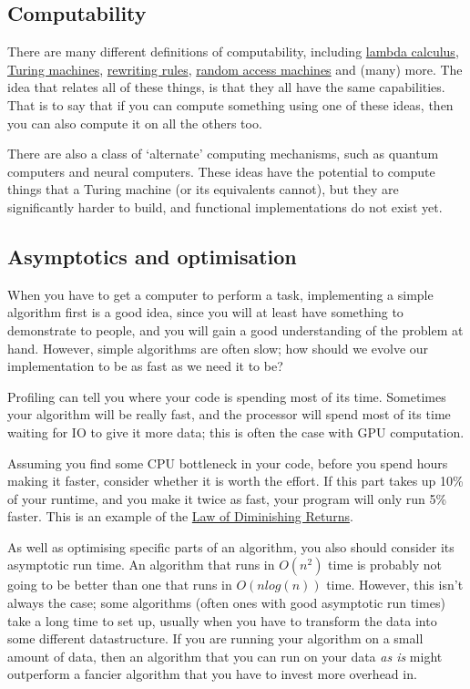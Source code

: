 \subsection{Computability}

There are many different definitions of computability, including
\href{https://en.wikipedia.org/wiki/Lambda_calculus}{lambda calculus},
\href{https://en.wikipedia.org/wiki/Turing_machine}{Turing machines},
\href{https://en.wikipedia.org/wiki/Rewriting}{rewriting rules},
\href{https://en.wikipedia.org/wiki/Random-access_machine}{random access
machines} and (many) more. The idea that relates all of these things, is that
they all have the same capabilities. That is to say that if you can compute
something using one of these ideas, then you can also compute it on all the
others too.

There are also a class of `alternate' computing mechanisms, such as quantum
computers and neural computers. These ideas have the potential to compute things
that a Turing machine (or its equivalents cannot), but they are significantly
harder to build, and functional implementations do not exist yet.

\subsection{Asymptotics and optimisation}

When you have to get a computer to perform a task, implementing a simple
algorithm first is a good idea, since you will at least have something to
demonstrate to people, and you will gain a good understanding of the problem at
hand. However, simple algorithms are often slow; how should we evolve our
implementation to be as fast as we need it to be?

Profiling can tell you where your code is spending most of its time. Sometimes
your algorithm will be really fast, and the processor will spend most of its
time waiting for IO to give it more data; this is often the case with GPU
computation.

Assuming you find some CPU bottleneck in your code, before you spend hours
making it faster, consider whether it is worth the effort. If this part takes up
10\% of your runtime, and you make it twice as fast, your program will only run
5\% faster. This is an example of the
\href{https://en.wikipedia.org/wiki/Diminishing_returns}{Law of Diminishing
Returns}.

As well as optimising specific parts of an algorithm, you also should consider
its asymptotic run time. An algorithm that runs in $O(n^2)$ time is probably not
going to be better than one that runs in $O(n log(n))$ time. However, this isn't
always the case; some algorithms (often ones with good asymptotic run times)
take a long time to set up, usually when you have to transform the data into
some different datastructure. If you are running your algorithm on a small
amount of data, then an algorithm that you can run on your data \textit{as is}
might outperform a fancier algorithm that you have to invest more overhead in.

